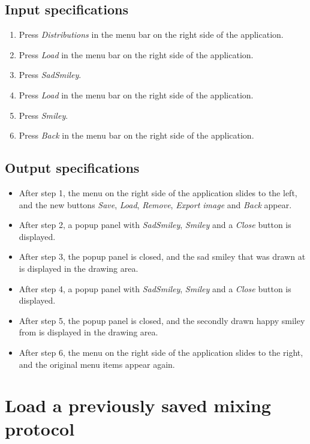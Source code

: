 \subsection*{Input specifications}
\begin{enumerate}
\item Press \emph{Distributions} in the menu bar on the right side of the application.
\item Press \emph{Load} in the menu bar on the right side of the application.
\item Press \emph{SadSmiley}.
\item Press \emph{Load} in the menu bar on the right side of the application.
\item Press \emph{Smiley}.
\item Press \emph{Back} in the menu bar on the right side of the application.
\end{enumerate}

\subsection*{Output specifications}
\begin{itemize}
\item After step 1, the menu on the right side of the application slides to the left, and the new buttons \emph{Save}, \emph{Load}, \emph{Remove}, \emph{Export image} and \emph{Back} appear.
\item After step 2, a popup panel with \emph{SadSmiley}, \emph{Smiley} and a \emph{Close} button is displayed.
\item After step 3, the popup panel is closed, and the sad smiley that was drawn at  is displayed in the drawing area.
\item After step 4, a popup panel with \emph{SadSmiley}, \emph{Smiley} and a \emph{Close} button is displayed.
\item After step 5, the popup panel is closed, and the secondly drawn happy smiley from  is displayed in the drawing area.
\item After step 6, the menu on the right side of the application slides to the right, and the original menu items appear again.
\end{itemize}

\section{Load a previously saved mixing protocol}

